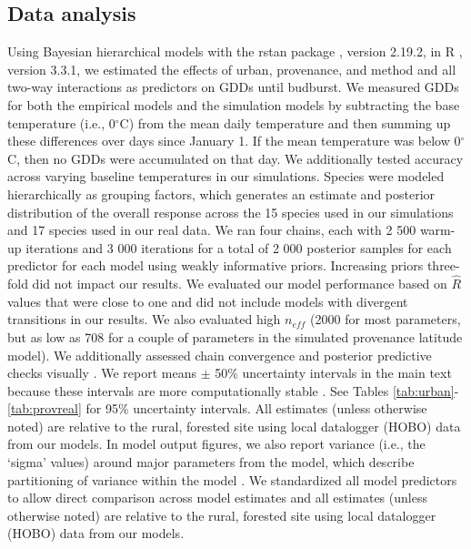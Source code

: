 \documentclass{article}\usepackage[]{graphicx}\usepackage[]{color}
\begin{document}
\subsection*{Data analysis}
Using Bayesian hierarchical models with the rstan package \citep{rstan2019}, version 2.19.2,  in R \citep{R}, version 3.3.1, we estimated the effects of urban, provenance, and method and all two-way interactions as predictors on GDDs until budburst. We measured GDDs for both the empirical models and the simulation models by subtracting the base temperature (i.e., 0$^{\circ}$C) from the mean daily temperature and then summing up these differences over days \citep{Asse2018} since January 1. If the mean temperature was below 0$^{\circ}$C, then no GDDs were accumulated on that day. We additionally tested accuracy across varying baseline temperatures in our simulations. Species were modeled hierarchically as grouping factors, which generates an estimate and posterior distribution of the overall response across the 15 species used in our simulations and 17 species used in our real data. We ran four chains, each with 2 500 warm-up iterations and 3 000 iterations for a total of 2 000 posterior samples for each predictor for each model using weakly informative priors. Increasing priors three-fold did not impact our results. We evaluated our model performance based on $\hat{R}$ values that were close to one and did not include models with divergent transitions in our results. We also evaluated high $n_{eff}$ (2000 for most parameters, but as low as 708 for a couple of parameters in the simulated provenance latitude model). We additionally assessed chain convergence and posterior predictive checks visually \citep{BDA}. We report means $\pm$ 50\% uncertainty intervals in the main text because these intervals are more computationally stable \citep{BDA,Carpenter2017}. See Tables \ref{tab:urban}-\ref{tab:provreal} for 95\% uncertainty intervals. All estimates (unless otherwise noted) are relative to the rural, forested site using local datalogger (HOBO) data from our models. In model output figures, we also report variance (i.e., the `sigma' values) around major parameters from the model, which describe partitioning of variance within the model \citep{BDA}. We standardized all model predictors to allow direct comparison across model estimates and all estimates (unless otherwise noted) are relative to the rural, forested site using local datalogger (HOBO) data from our models. %
\end{document}
